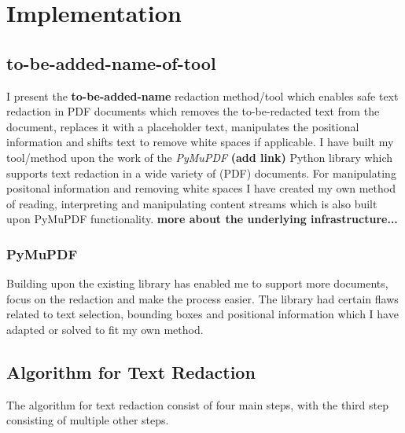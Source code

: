 \chapter{Implementation}

\section{to-be-added-name-of-tool}
I present the \textbf{to-be-added-name} redaction method/tool which enables safe text redaction in PDF documents which removes the to-be-redacted text from the document, replaces it with a placeholder text, manipulates the positional information and shifts text to remove white spaces if applicable. I have built my tool/method upon the work of the \textit{PyMuPDF} \textbf{(add link)} Python library which supports text redaction in a wide variety of (PDF) documents. For manipulating positonal information and removing white spaces I have created my own method of reading, interpreting and manipulating content streams which is also built upon PyMuPDF functionality. \textbf{more about the underlying infrastructure...}

\subsection{PyMuPDF}
Building upon the existing library has enabled me to support more documents, focus on the redaction and make the process easier. The library had certain flaws related to text selection, bounding boxes and positional information which I have adapted or solved to fit my own method. 



\section{Algorithm for Text Redaction}
The algorithm for text redaction consist of four main steps, with the third step consisting of multiple other steps. 

